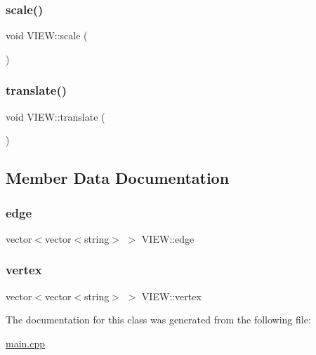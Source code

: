 \subsubsection{\texorpdfstring{scale()}{scale()}}
{\footnotesize\ttfamily void V\+I\+E\+W\+::scale (\begin{DoxyParamCaption}{ }\end{DoxyParamCaption})\hspace{0.3cm}{\ttfamily [inline]}}

\mbox{\label{class_v_i_e_w_a8eb72bffa6e630328a51710f5ce84f9b}} 
\subsubsection{\texorpdfstring{translate()}{translate()}}
{\footnotesize\ttfamily void V\+I\+E\+W\+::translate (\begin{DoxyParamCaption}{ }\end{DoxyParamCaption})\hspace{0.3cm}{\ttfamily [inline]}}



\subsection{Member Data Documentation}
\mbox{\label{class_v_i_e_w_a1f0a3791f9244133bb2013de43559111}} 
\subsubsection{\texorpdfstring{edge}{edge}}
{\footnotesize\ttfamily vector$<$vector$<$string$>$ $>$ V\+I\+E\+W\+::edge}

\mbox{\label{class_v_i_e_w_a59a37316ac1fea0dab37868f737b9ff6}} 
\subsubsection{\texorpdfstring{vertex}{vertex}}
{\footnotesize\ttfamily vector$<$vector$<$string$>$ $>$ V\+I\+E\+W\+::vertex}



The documentation for this class was generated from the following file\+:\begin{DoxyCompactItemize}
\item 
\mbox{\hyperlink{main_8cpp}{main.\+cpp}}\end{DoxyCompactItemize}
